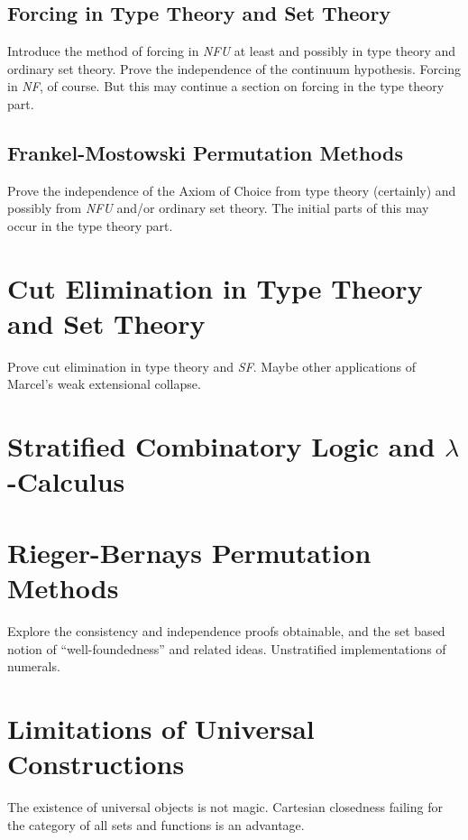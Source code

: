\documentclass[12pt]{book}
\begin{document}
\subsection{Forcing in Type Theory and Set Theory}

Introduce the method of forcing in {\em NFU\/} at least and possibly
in type theory and ordinary set theory.  Prove the independence of the
continuum hypothesis.  Forcing in {\em NF\/}, of course.  But this may
continue a section on forcing in the type theory part.

\subsection{Frankel-Mostowski Permutation Methods}

Prove the independence of the Axiom of Choice from type theory
(certainly) and possibly from {\em NFU\/} and/or ordinary set theory.
The initial parts of this may occur in the type theory part.

\section{Cut Elimination in Type Theory and Set Theory}

Prove cut elimination in type theory and {\em SF\/}.  Maybe other
applications of Marcel's weak extensional collapse.

\section{Stratified Combinatory Logic and $\lambda$-Calculus}

\section{Rieger-Bernays Permutation Methods}

Explore the consistency and independence proofs obtainable, and the
set based notion of ``well-foundedness'' and related ideas.
Unstratified implementations of numerals.

\section{Limitations of Universal Constructions}

The existence of universal objects is not magic.  Cartesian closedness
failing for the category of all sets and functions is an advantage.
\end{document}
